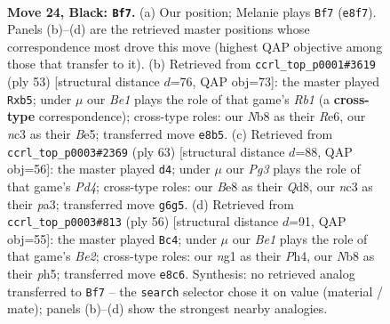 \documentclass[11pt]{article}
\begin{document}
\clearpage

\begin{figure}[p]\centering
\begin{subfigure}{0.46\textwidth}\centering
\resizebox{\linewidth}{!}{%
\newchessgame
\chessboard[
  setfen={rn2b3/pp2k3/1p2p1p1/1P1pP3/1P1P2Q1/2N4B/8/4K1N1 b - - 2 24},
  showmover=false,
  pgfstyle=straightmove, color=movearrow, markmove={e8-f7}
]}
\caption{}
\end{subfigure}\hfill
\begin{subfigure}{0.46\textwidth}\centering
\resizebox{\linewidth}{!}{%
\newchessgame
\chessboard[
  setfen={1r6/5k2/4r1p1/1Pp1b2p/p2pP3/P5P1/1PQB3P/6K1 b - - 0 27},
  showmover=false,
  pgfstyle=straightmove, color=movearrow, markmove={b8-b5}
]}
\caption{}
\end{subfigure}
\\[4pt]
\begin{subfigure}{0.46\textwidth}\centering
\resizebox{\linewidth}{!}{%
\newchessgame
\chessboard[
  setfen={3q4/5k1p/1pQ1p1p1/p2p2P1/P4P2/P2bP2P/6B1/6K1 b - - 2 32},
  showmover=false,
  pgfstyle=straightmove, color=movearrow, markmove={d5-d4}
]}
\caption{}
\end{subfigure}\hfill
\begin{subfigure}{0.46\textwidth}\centering
\resizebox{\linewidth}{!}{%
\newchessgame
\chessboard[
  setfen={2Q5/p4nk1/1p1qp3/5p1p/1P4pP/P3P3/4BPP1/6K1 w - - 1 29},
  showmover=false,
  pgfstyle=straightmove, color=movearrow, markmove={e2-c4}
]}
\caption{}
\end{subfigure}
\caption{\textbf{Move 24, Black: \texttt{Bf7}.} (a) Our position; Melanie plays \texttt{Bf7} (\texttt{e8f7}). Panels (b)--(d) are the retrieved master positions whose correspondence most drove this move (highest QAP objective among those that transfer to it). (b) Retrieved from \texttt{ccrl\_top\_p0001\#3619} (ply 53) [structural distance $d$=76, QAP obj=73]: the master played \texttt{Rxb5}; under $\mu$ our \emph{Be1} plays the role of that game's \emph{Rb1} (a \textbf{cross-type} correspondence); cross-type roles: our \emph{N}b8 as their \emph{R}e6, our \emph{n}c3 as their \emph{B}e5; transferred move \texttt{e8b5}. (c) Retrieved from \texttt{ccrl\_top\_p0003\#2369} (ply 63) [structural distance $d$=88, QAP obj=56]: the master played \texttt{d4}; under $\mu$ our \emph{Pg3} plays the role of that game's \emph{Pd4}; cross-type roles: our \emph{B}e8 as their \emph{Q}d8, our \emph{n}c3 as their \emph{p}a3; transferred move \texttt{g6g5}. (d) Retrieved from \texttt{ccrl\_top\_p0003\#813} (ply 56) [structural distance $d$=91, QAP obj=55]: the master played \texttt{Bc4}; under $\mu$ our \emph{Be1} plays the role of that game's \emph{Be2}; cross-type roles: our \emph{n}g1 as their \emph{P}h4, our \emph{N}b8 as their \emph{p}h5; transferred move \texttt{e8c6}. Synthesis: no retrieved analog transferred to \texttt{Bf7} -- the \texttt{search} selector chose it on value (material / mate); panels (b)--(d) show the strongest nearby analogies.}
\label{fig:thought-m47}
\end{figure}
\end{document}
